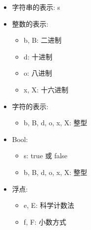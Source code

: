 \begin{itemize}
\item 
字符串的表示: s

\item 
整数的表示:

\begin{itemize}
\item 
b, B: 二进制

\item
d: 十进制 

\item 
o: 八进制

\item 
x, X: 十六进制
\end{itemize}

\item 
字符的表示:

\begin{itemize}
\item 
b, B, d, o, x, X: 整型
\end{itemize}

\item 
Bool:

\begin{itemize}
\item 
s: true 或 false

\item 
b, B, d, o, x, X: 整型
\end{itemize}

\item 
浮点:

\begin{itemize}
\item 
e, E: 科学计数法

\item 
f, F: 小数方式
\end{itemize}

\end{itemize}









































